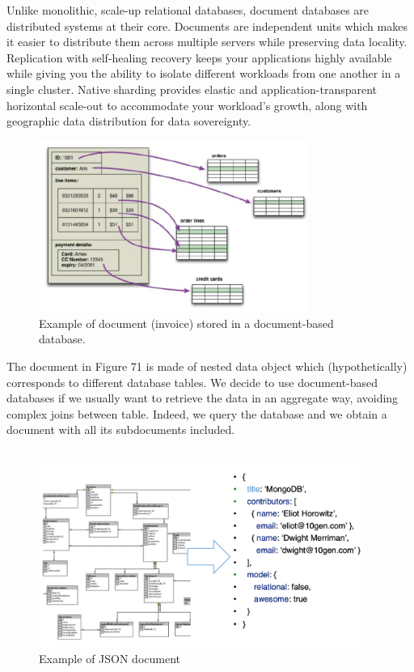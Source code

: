 \documentclass[10pt,a4paper]{article}
\newcommand{\nline}{\\~\\}
\begin{document}
\begin{enumerate}
 	Unlike monolithic, scale-up relational databases, document databases are distributed systems at their core. Documents are independent units which makes it easier to distribute them across multiple servers while preserving data locality. Replication with self-healing recovery keeps your applications highly available while giving you the ability to isolate different workloads from one another in a single cluster. Native sharding provides elastic and application-transparent horizontal scale-out to accommodate your workload’s growth, along with geographic data distribution for data sovereignty.
 \end{enumerate}
 
 \begin{figure}[ht!]
 \hfill \includegraphics[width=250pt]{images/document-based.png}\hspace*{\fill}
  \caption{Example of document (invoice) stored in a document-based database.}
\end{figure}  

The document in Figure 71 is made of nested data object which (hypothetically) corresponds to different database tables. We decide to use document-based databases if we usually want to retrieve the data in an aggregate way, avoiding complex joins between table. Indeed, we query the database and we obtain a document with all its subdocuments included. \nline
 
\begin{figure}[ht!]
 \hfill \includegraphics[width=300pt]{images/relational-to-document.png}\hspace*{\fill}
  \caption{Example of JSON document}
\end{figure}  
 
\end{document}
